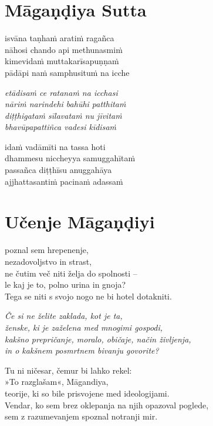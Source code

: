 

\cleartoverso
\chapter*{Māgaṇḍiya Sutta}

isvāna taṇhaṁ aratiṁ ragañca\\
nāhosi chando api methunasmiṁ\\
kimevidaṁ muttakarīsapuṇṇaṁ\\
pādāpi naṁ samphusituṁ na icche

\emph{etādisaṁ ce ratanaṁ na icchasi}\\
\emph{nāriṁ narindehi bahūhi patthitaṁ}\\
\emph{diṭṭhigataṁ sīlavataṁ nu jīvitaṁ}\\
\emph{bhavūpapattiñca vadesi kīdisaṁ}

idaṁ vadāmīti na tassa hoti\\
dhammesu niccheyya samuggahītaṁ\\
passañca diṭṭhīsu anuggahāya\\
ajjhattasantiṁ pacinaṁ adassaṁ


\cleartorecto
\chapter{Učenje Māgaṇḍiyi}

poznal sem hrepenenje,\\
nezadovoljstvo in strast,\\
ne čutim več niti želja do spolnosti --\\
le kaj je to, polno urina in gnoja?\\
Tega se niti s svojo nogo ne bi hotel dotakniti.

\emph{Če si ne želite zaklada, kot je ta,\\
ženske, ki je zaželena med mnogimi gospodi,\\
kakšno prepričanje, moralo, običaje, način življenja,\\
in o kakšnem posmrtnem bivanju govorite?}

Tu ni ničesar, čemur bi lahko rekel:\\\vin »To razglašam«, Māgandiya,\\
teorije, ki so bile prisvojene med ideologijami.\\
Vendar, ko sem brez oklepanja na njih opazoval poglede,\\
sem z razumevanjem spoznal notranji mir.

